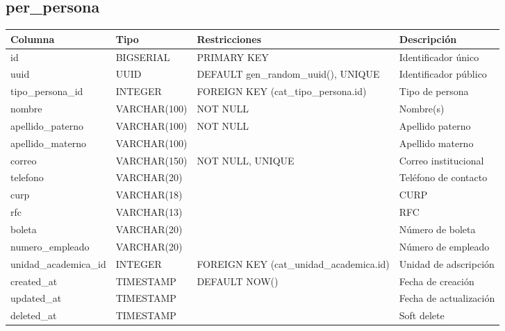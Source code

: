 \documentclass[12pt, a4paper]{article}
\begin{document}
\subsection{per\_persona}
\begin{longtable}{|p{3.5cm}|p{2.5cm}|p{3cm}|p{5cm}|}
    \hline
    \rowcolor[gray]{0.9}
    \textbf{Columna} & \textbf{Tipo} & \textbf{Restricciones} & \textbf{Descripción} \\
    \hline
    id & BIGSERIAL & PRIMARY KEY & Identificador único \\
    \hline
    uuid & UUID & DEFAULT gen\_random\_uuid(), UNIQUE & Identificador público \\
    \hline
    tipo\_persona\_id & INTEGER & FOREIGN KEY (cat\_tipo\_persona.id) & Tipo de persona \\
    \hline
    nombre & VARCHAR(100) & NOT NULL & Nombre(s) \\
    \hline
    apellido\_paterno & VARCHAR(100) & NOT NULL & Apellido paterno \\
    \hline
    apellido\_materno & VARCHAR(100) & & Apellido materno \\
    \hline
    correo & VARCHAR(150) & NOT NULL, UNIQUE & Correo institucional \\
    \hline
    telefono & VARCHAR(20) & & Teléfono de contacto \\
    \hline
    curp & VARCHAR(18) & & CURP \\
    \hline
    rfc & VARCHAR(13) & & RFC \\
    \hline
    boleta & VARCHAR(20) & & Número de boleta \\
    \hline
    numero\_empleado & VARCHAR(20) & & Número de empleado \\
    \hline
    unidad\_academica\_id & INTEGER & FOREIGN KEY (cat\_unidad\_academica.id) & Unidad de adscripción \\
    \hline
    created\_at & TIMESTAMP & DEFAULT NOW() & Fecha de creación \\
    \hline
    updated\_at & TIMESTAMP & & Fecha de actualización \\
    \hline
    deleted\_at & TIMESTAMP & & Soft delete \\
    \hline
\end{longtable}
\end{document}
